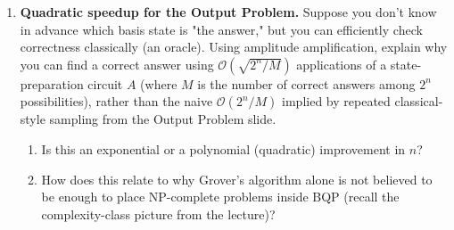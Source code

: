 \documentclass[11pt]{article}
\begin{document}
\begin{enumerate}[label=\textbf{Exercise \arabic*.}, leftmargin=2.2cm]
\item \textbf{Quadratic speedup for the Output Problem.}
Suppose you don't know in advance which basis state is "the answer,"
but you can efficiently check correctness classically (an oracle).
Using amplitude amplification, explain why you can find a correct
answer using $\mathcal O\!\left(\sqrt{2^n/M}\right)$ applications of a
state-preparation circuit $A$ (where $M$ is the number of correct
answers among $2^n$ possibilities), rather than the naive
$\mathcal O(2^n/M)$ implied by repeated classical-style sampling from
the Output Problem slide.
\begin{enumerate}[label=(\alph*)]
\item Is this an exponential or a polynomial (quadratic) improvement in
$n$?
\item How does this relate to why Grover's algorithm alone is not
believed to be enough to place NP-complete problems inside BQP (recall
the complexity-class picture from the lecture)?
\end{enumerate}

\end{enumerate}
\end{document}
